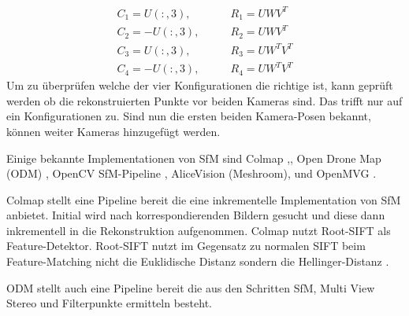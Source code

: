 \documentclass[12pt,titlepage, twoside]{article}
\begin{document}
\begin{equation}
    \label{eq:sfm:camera:pose}
    \begin{split}
    C_1=U(:,3),&\qquad R_1=UWV^T \\
    C_2=-U(:,3),&\qquad R_2=UWV^T \\
    C_3=U(:,3),&\qquad R_3=UW^TV^T \\
    C_4=-U(:,3),&\qquad R_4=UW^TV^T
    \end{split}
\end{equation}
Um zu überprüfen welche der vier Konfigurationen die richtige ist, kann geprüft werden ob die rekonstruierten Punkte vor beiden Kameras sind. Das trifft nur auf ein Konfigurationen zu.
Sind nun die ersten beiden Kamera-Posen bekannt, können weiter Kameras hinzugefügt werden. 



Einige bekannte Implementationen von SfM sind Colmap \cite{schoenberger2016sfm},\cite{schoenberger2016mvs}, Open Drone Map (ODM) \cite{ODM}, OpenCV SfM-Pipeline \cite{opencv}, AliceVision (Meshroom)\cite{Moulon2012},\cite{Jancosek2011} und OpenMVG \cite{moulon2016openmvg}.

Colmap stellt eine Pipeline bereit die eine inkrementelle Implementation von SfM anbietet. Initial wird nach korrespondierenden Bildern gesucht und diese dann inkrementell in die Rekonstruktion aufgenommen.
Colmap nutzt Root-SIFT als Feature-Detektor. Root-SIFT nutzt im Gegensatz zu normalen SIFT beim Feature-Matching nicht die Euklidische Distanz sondern die Hellinger-Distanz \cite{arandjelovic2012three}.

ODM stellt auch eine Pipeline bereit die aus den Schritten SfM, Multi View Stereo und Filterpunkte ermitteln besteht. 
\end{document}
